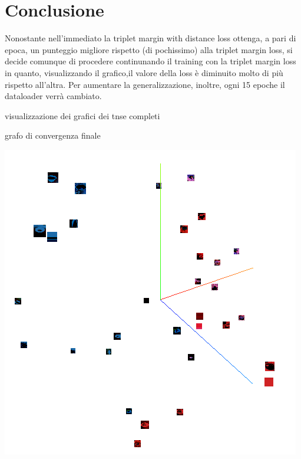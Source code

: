 \documentclass[11pt]{article}
\begin{document}
\section{Conclusione}

Nonostante nell'immediato la triplet margin with distance loss ottenga, a pari di epoca, un punteggio migliore rispetto (di pochissimo)
alla triplet margin loss,
si decide comunque di procedere continunando il training con la triplet margin loss in quanto, visualizzando il grafico,il valore della loss
è diminuito molto di più rispetto all'altra.
Per aumentare la generalizzazione, inoltre, ogni 15 epoche il dataloader verrà cambiato. 

\begin{center}
    visualizzazione dei grafici dei tnse completi
\end{center}

\begin{center}
    grafo di convergenza finale
\end{center}

\begin{center}
    \begin{minipage}{0.48\linewidth}
    \includegraphics[width=\linewidth]{tensorboard_2.png}
    \end{minipage}
\end{center}
\end{document}
